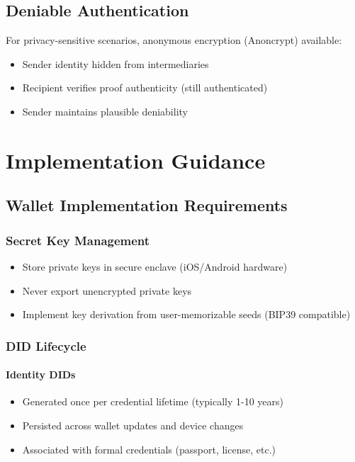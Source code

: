\section{Deniable Authentication}

For privacy-sensitive scenarios, anonymous encryption (Anoncrypt) available:

\begin{itemize}
  \item Sender identity hidden from intermediaries
  \item Recipient verifies proof authenticity (still authenticated)
  \item Sender maintains plausible deniability
\end{itemize}

\chapter{Implementation Guidance}

\section{Wallet Implementation Requirements}

\subsection{Secret Key Management}

\begin{itemize}
  \item Store private keys in secure enclave (iOS/Android hardware)
  \item Never export unencrypted private keys
  \item Implement key derivation from user-memorizable seeds (BIP39 compatible)
\end{itemize}

\subsection{DID Lifecycle}

\subsubsection{Identity DIDs}

\begin{itemize}
  \item Generated once per credential lifetime (typically 1-10 years)
  \item Persisted across wallet updates and device changes
  \item Associated with formal credentials (passport, license, etc.)
\end{itemize}

